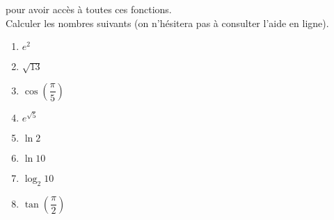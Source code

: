 pour avoir accès à toutes ces fonctions. \\
Calculer les nombres suivants (on n'hésitera pas à consulter l'aide en ligne).
  \begin{enumerate}[label=\emph{\alph*)}]
    \item $e^2$
    \item $\sqrt{13}$
    \item $\cos\left(\dfrac{\pi}{5}\right)$
    \item $e^{\sqrt{5}}$
    \item $\ln 2$
    \item $\ln 10$
    \item $\log_{2} 10$
    \item $\tan\left(\dfrac{\pi}{2}\right)$
  \end{enumerate}

